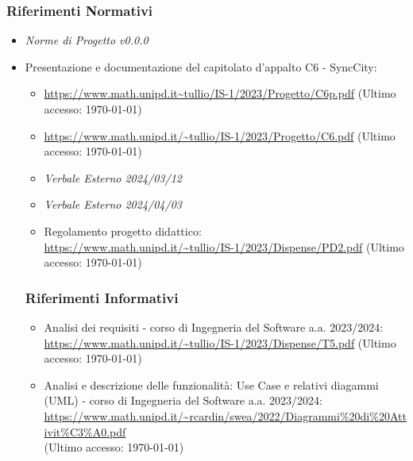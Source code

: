 \documentclass[8pt]{article}
\begin{document}
\subsubsection{Riferimenti Normativi}
\begin{itemize}
	\setlength\itemsep{0em}
	\item \textit{Norme di Progetto v0.0.0}
	\item Presentazione e documentazione del capitolato d’appalto C6 - SyncCity:
	\begin{itemize}
		\item \href{https://www.math.unipd.it/~tullio/IS-1/2023/Progetto/C6p.pdf}{https://www.math.unipd.it\textasciitilde{}tullio/IS-1/2023/Progetto/C6p.pdf} (Ultimo accesso: \today)
		\item \href{https://www.math.unipd.it/~tullio/IS-1/2023/Progetto/C6.pdf}{https://www.math.unipd.it/\textasciitilde{}tullio/IS-1/2023/Progetto/C6.pdf} (Ultimo accesso: \today)
	\item \textit{Verbale Esterno 2024/03/12}
	\item \textit{Verbale Esterno 2024/04/03}
	\item Regolamento progetto didattico: \\ \href{https://www.math.unipd.it/~tullio/IS-1/2023/Dispense/PD2.pdf}{https://www.math.unipd.it/\textasciitilde{}tullio/IS-1/2023/Dispense/PD2.pdf} (Ultimo accesso: \today)
\end{itemize}
\subsubsection{Riferimenti Informativi}
\begin{itemize}
	\setlength\itemsep{0em}
	\item Analisi dei requisiti - corso di Ingegneria del Software a.a. 2023/2024: \\ \href{https://www.math.unipd.it/~tullio/IS-1/2023/Dispense/T5.pdf}{https://www.math.unipd.it/\textasciitilde{}tullio/IS-1/2023/Dispense/T5.pdf} (Ultimo accesso: \today)
    \item Analisi e descrizione delle funzionalità: Use Case e relativi diagammi (UML) - corso di Ingegneria del Software a.a. 2023/2024: \\ \href{https://www.math.unipd.it/~rcardin/swea/2022/Diagrammi%20di%20Attivit%C3%A0.pdf}{https://www.math.unipd.it/\textasciitilde{}rcardin/swea/2022/Diagrammi\%20di\%20Attivit\%C3\%A0.pdf} \\ (Ultimo accesso: \today)
\end{itemize}
\newpage


\end{itemize}
\end{document}
